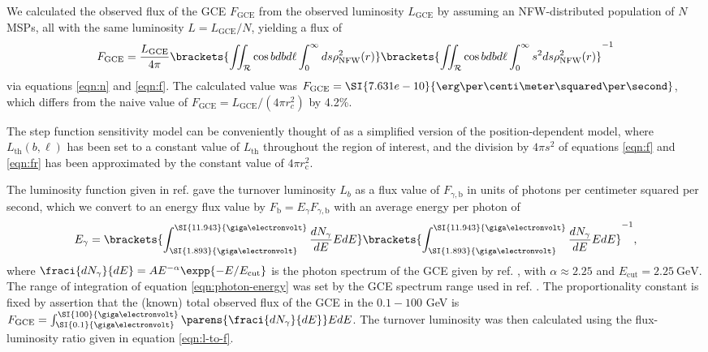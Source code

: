 \documentclass{C://Aliases//Dropbox-MIT//Latex_Templates//personal}
\begin{document}
We calculated the observed flux of the GCE $F_\text{GCE}$ from the observed luminosity $L_\text{GCE}$ by assuming an NFW-distributed population of $N$ MSPs, all with the same luminosity $L = L_\text{GCE} / N$, yielding a flux of 
\begin{equation}
    F_\text{GCE} = \frac{L_\text{GCE}}{4\pi}\brackets{\iint_{\mathcal{R}}\cos b db d\ell \int_0^\infty ds \rho_\text{NFW}^2 (r)}\brackets{\iint_{\mathcal{R}}\cos b db d\ell \int_0^\infty s^2 ds \rho_\text{NFW}^2 (r)}^{-1}
    \label{eqn:l-to-f}
\end{equation}
via equations \ref{eqn:n} and \ref{eqn:f}. The calculated value was $F_\text{GCE}=\SI{7.631e-10}{\erg\per\centi\meter\squared\per\second}$, which differs from the naive value of $F_\text{GCE} = L_\text{GCE} / (4\pi r_c^2)$ by 4.2\%.

The step function sensitivity model can be conveniently thought of as a simplified version of the position-dependent model, where $L_\text{th}(b, \ell)$ has been set to a constant value of $L_\text{th}$ throughout the region of interest, and the division by $4\pi s^2$ of equations \ref{eqn:f} and \ref{eqn:fr} has been approximated by the constant value of $4\pi r_\text{c}^2$.

The luminosity function given in ref. \cite{Lee:2015fea} gave the turnover luminosity $L_b$ as a flux value of $F_{\gamma, \text{b}}$ in units of photons per centimeter squared per second, which we convert to an energy flux value by $F_\text{b} = E_\gamma F_{\gamma, \text{b}}$ with an average energy per photon of
\begin{equation}
    E_\gamma = \brackets{\int_{\SI{1.893}{\giga\electronvolt}}^{\SI{11.943}{\giga\electronvolt}} \frac{dN_\gamma}{dE} E dE} \brackets{\int_{\SI{1.893}{\giga\electronvolt}}^{\SI{11.943}{\giga\electronvolt}} \frac{dN_\gamma}{dE} E dE }^{-1},
    \label{eqn:photon-energy}
\end{equation}
where $\fraci{dN_\gamma}{dE} = A E^{-\alpha} \expp{-E / E_\text{cut}}$ is the photon spectrum of the GCE given by ref. \cite{Calore:2014xka}, with $\alpha \approx 2.25$ and $E_\text{cut} = \SI{2.25}{\giga\electronvolt}$. The range of integration of equation \ref{eqn:photon-energy} was set by the GCE spectrum range used in  ref. \cite{Lee:2015fea}. The proportionality constant is fixed by assertion that the (known) total observed flux of the GCE in the $0.1-100$ GeV is $F_\text{GCE} = \int_{\SI{0.1}{\giga\electronvolt}}^{\SI{100}{\giga\electronvolt}} \parens{\fraci{dN_\gamma}{dE}}E dE$. The turnover luminosity was then calculated using the flux-luminosity ratio given in equation \ref{eqn:l-to-f}.
\end{document}
